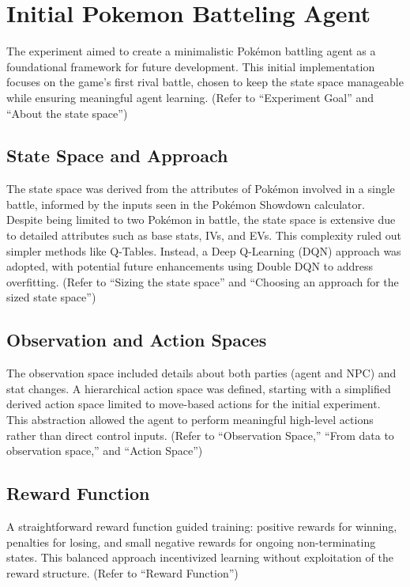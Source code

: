 \section{Initial Pokemon Batteling Agent}

The experiment aimed to create a minimalistic Pokémon battling agent as a foundational framework for future development. This initial implementation focuses on the game's first rival battle, chosen to keep the state space manageable while ensuring meaningful agent learning. (Refer to “Experiment Goal” and “About the state space”)

\subsection{State Space and Approach}

The state space was derived from the attributes of Pokémon involved in a single battle, informed by the inputs seen in the Pokémon Showdown calculator. Despite being limited to two Pokémon in battle, the state space is extensive due to detailed attributes such as base stats, IVs, and EVs. This complexity ruled out simpler methods like Q-Tables. Instead, a Deep Q-Learning (DQN) approach was adopted, with potential future enhancements using Double DQN to address overfitting. (Refer to “Sizing the state space” and “Choosing an approach for the sized state space”)

\subsection{Observation and Action Spaces}

The observation space included details about both parties (agent and NPC) and stat changes. A hierarchical action space was defined, starting with a simplified derived action space limited to move-based actions for the initial experiment. This abstraction allowed the agent to perform meaningful high-level actions rather than direct control inputs. (Refer to “Observation Space,” “From data to observation space,” and “Action Space”)

\subsection{Reward Function}

A straightforward reward function guided training: positive rewards for winning, penalties for losing, and small negative rewards for ongoing non-terminating states. This balanced approach incentivized learning without exploitation of the reward structure. (Refer to “Reward Function”)

